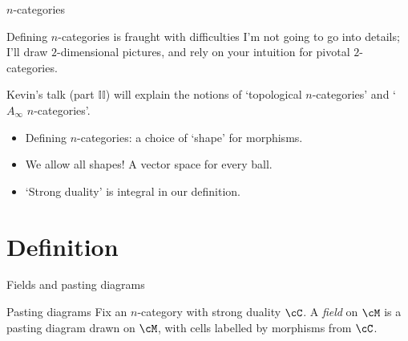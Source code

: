 \documentclass[beamer, compress]{beamer}
\begin{document}
\begin{frame}{$n$-categories}
\begin{block}{Defining $n$-categories is fraught with difficulties}
I'm not going to go into details; I'll draw $2$-dimensional pictures, and rely on your intuition for pivotal $2$-categories.
\end{block}
\begin{block}{}
Kevin's talk (part $\mathbb{II}$) will explain the notions of `topological $n$-categories' and `$A_\infty$ $n$-categories'.
\end{block}

\begin{block}{}
\begin{itemize}
\item
Defining $n$-categories: a choice of `shape' for morphisms.
\item
We allow all shapes! A vector space for every ball.
\item
`Strong duality' is integral in our definition.
\end{itemize}
\end{block}
\end{frame}

\newcommand{\roundframe}[1]{\begin{tikzpicture}[baseline=-2pt]\node[rectangle,inner sep=1pt,rounded corners,fill=white] {#1};\end{tikzpicture}}

\section{Definition}
\begin{frame}{Fields and pasting diagrams}
\begin{block}{Pasting diagrams}
Fix an $n$-category with strong duality $\cC$. A \emph{field} on $\cM$ is a pasting diagram drawn on $\cM$, with cells labelled by morphisms from $\cC$.
\end{block}
\end{frame}
\end{document}
